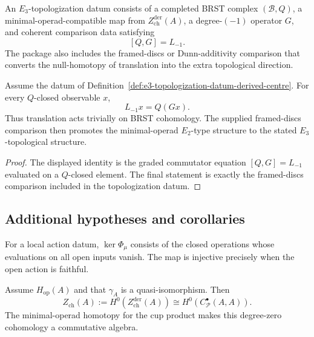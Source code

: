 \begin{definition}
\label{def:e3-topologization-datum-derived-centre}
An \(E_3\)-topologization datum consists of a completed BRST complex
\((\mathcal B,Q)\), a minimal-operad-compatible map from
\(Z^{\mathrm{der}}_{\mathrm{ch}}(A)\), a degree-\((-1)\) operator
\(G\), and coherent comparison data satisfying
\[
 [Q,G]=L_{-1}.
\]
The package also includes the framed-discs or Dunn-additivity
comparison that converts the null-homotopy of translation into the
extra topological direction.
\end{definition}

\begin{proposition}
\label{prop:e2-center-not-e3-topologization}
Assume the datum of
Definition~\ref{def:e3-topologization-datum-derived-centre}.  For every
\(Q\)-closed observable \(x\),
\[
 L_{-1}x=Q(Gx).
\]
Thus translation acts trivially on BRST cohomology.  The supplied
framed-discs comparison then promotes the minimal-operad
\(E_2\)-type structure to the stated \(E_3\)-topological structure.
\end{proposition}

\begin{proof}
The displayed identity is the graded commutator equation
\([Q,G]=L_{-1}\) evaluated on a \(Q\)-closed element.  The final
statement is exactly the framed-discs comparison included in the
topologization datum.
\end{proof}

\subsection{Additional hypotheses and corollaries}
\label{subsec:additional-hypotheses}

\begin{remark}
\label{rem:faithfulness-hypothesis}
For a local action datum, \(\ker\Phi_\mu\) consists of the closed
operations whose evaluations on all open inputs vanish.  The map is
injective precisely when the open action is faithful.
\end{remark}

\begin{corollary}
\label{cor:chiral-center}
Assume \(H_{\mathrm{op}}(A)\) and that \(\gamma_A\) is a
quasi-isomorphism.  Then
\[
 Z_{\mathrm{ch}}(A)
 :=
 H^0\!\left(Z^{\mathrm{der}}_{\mathrm{ch}}(A)\right)
 \cong H^0\!\left(C^\bullet_{\mathcal P}(A,A)\right).
\]
The minimal-operad homotopy for the cup product makes this degree-zero
cohomology a commutative algebra.
\end{corollary}

